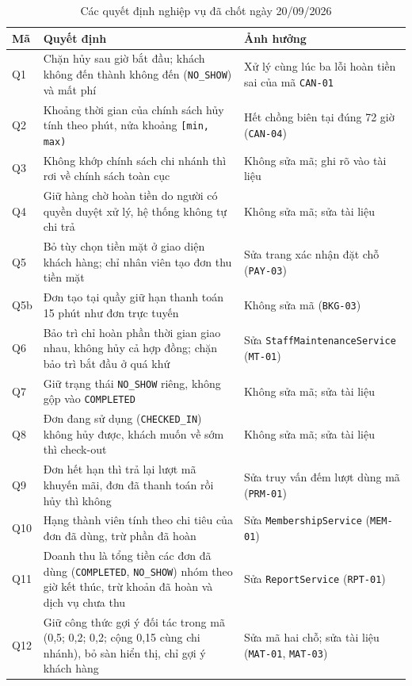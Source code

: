 \begin{table}[H]
\centering
\caption{Các quyết định nghiệp vụ đã chốt ngày 20/09/2026}
\label{tab:pl_quyetdinh}
\footnotesize
\renewcommand{\arraystretch}{1.2}
\begin{tabular}{|p{1.1cm}|p{7.6cm}|p{5.1cm}|}
\hline
\textbf{Mã} & \textbf{Quyết định} & \textbf{Ảnh hưởng} \\
\hline
Q1 & Chặn hủy sau giờ bắt đầu; khách không đến thành không đến (\texttt{NO\_SHOW}) và mất phí & Xử lý cùng lúc ba lỗi hoàn tiền sai của mã \texttt{CAN-01} \\
\hline
Q2 & Khoảng thời gian của chính sách hủy tính theo phút, nửa khoảng \texttt{[min, max)} & Hết chồng biên tại đúng 72 giờ (\texttt{CAN-04}) \\
\hline
Q3 & Không khớp chính sách chi nhánh thì rơi về chính sách toàn cục & Không sửa mã; ghi rõ vào tài liệu \\
\hline
Q4 & Giữ hàng chờ hoàn tiền do người có quyền duyệt xử lý, hệ thống không tự chi trả & Không sửa mã; sửa tài liệu \\
\hline
Q5 & Bỏ tùy chọn tiền mặt ở giao diện khách hàng; chỉ nhân viên tạo đơn thu tiền mặt & Sửa trang xác nhận đặt chỗ (\texttt{PAY-03}) \\
\hline
Q5b & Đơn tạo tại quầy giữ hạn thanh toán 15 phút như đơn trực tuyến & Không sửa mã (\texttt{BKG-03}) \\
\hline
Q6 & Bảo trì chỉ hoàn phần thời gian giao nhau, không hủy cả hợp đồng; chặn bảo trì bắt đầu ở quá khứ & Sửa \texttt{StaffMaintenanceService} (\texttt{MT-01}) \\
\hline
Q7 & Giữ trạng thái \texttt{NO\_SHOW} riêng, không gộp vào \texttt{COMPLETED} & Không sửa mã; sửa tài liệu \\
\hline
Q8 & Đơn đang sử dụng (\texttt{CHECKED\_IN}) không hủy được, khách muốn về sớm thì check-out & Không sửa mã; sửa tài liệu \\
\hline
Q9 & Đơn hết hạn thì trả lại lượt mã khuyến mãi, đơn đã thanh toán rồi hủy thì không & Sửa truy vấn đếm lượt dùng mã (\texttt{PRM-01}) \\
\hline
Q10 & Hạng thành viên tính theo chi tiêu của đơn đã dùng, trừ phần đã hoàn & Sửa \texttt{MembershipService} (\texttt{MEM-01}) \\
\hline
Q11 & Doanh thu là tổng tiền các đơn đã dùng (\texttt{COMPLETED}, \texttt{NO\_SHOW}) nhóm theo giờ kết thúc, trừ khoản đã hoàn và dịch vụ chưa thu & Sửa \texttt{ReportService} (\texttt{RPT-01}) \\
\hline
Q12 & Giữ công thức gợi ý đối tác trong mã (0,5; 0,2; 0,2; cộng 0,15 cùng chi nhánh), bỏ sàn hiển thị, chỉ gợi ý khách hàng & Sửa mã hai chỗ; sửa tài liệu (\texttt{MAT-01}, \texttt{MAT-03}) \\

\end{tabular}
\end{table}
